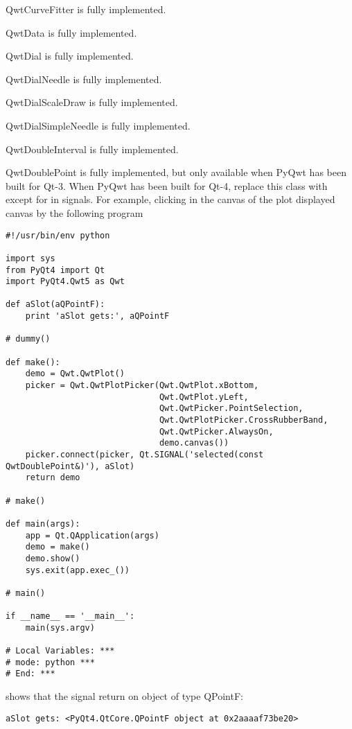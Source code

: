 \documentclass{manual}
\begin{document}
\begin{classdesc*}{QwtCurveFitter}
  is fully implemented.
\end{classdesc*}

\begin{classdesc*}{QwtData}
  is fully implemented.
\end{classdesc*}

\begin{classdesc*}{QwtDial}
  is fully implemented.
\end{classdesc*}

\begin{classdesc*}{QwtDialNeedle}
  is fully implemented.
\end{classdesc*}

\begin{classdesc*}{QwtDialScaleDraw}
  is fully implemented.
\end{classdesc*}

\begin{classdesc*}{QwtDialSimpleNeedle}
  is fully implemented.
\end{classdesc*}

\begin{classdesc*}{QwtDoubleInterval}
  is fully implemented.
\end{classdesc*}

\begin{classdesc*}{QwtDoublePoint}
  is fully implemented, but only available when PyQwt has been built for Qt-3.
  When PyQwt has been built for Qt-4, replace this class with 
  except for in signals.
  For example, clicking in the canvas of the plot displayed canvas by the
  following program
  \begin{verbatim}
#!/usr/bin/env python

import sys
from PyQt4 import Qt
import PyQt4.Qwt5 as Qwt

def aSlot(aQPointF):
    print 'aSlot gets:', aQPointF

# dummy()

def make():
    demo = Qwt.QwtPlot()
    picker = Qwt.QwtPlotPicker(Qwt.QwtPlot.xBottom,
                               Qwt.QwtPlot.yLeft,
                               Qwt.QwtPicker.PointSelection,
                               Qwt.QwtPlotPicker.CrossRubberBand,
                               Qwt.QwtPicker.AlwaysOn,
                               demo.canvas())
    picker.connect(picker, Qt.SIGNAL('selected(const QwtDoublePoint&)'), aSlot)
    return demo

# make()

def main(args):
    app = Qt.QApplication(args)
    demo = make()
    demo.show()
    sys.exit(app.exec_())

# main()

if __name__ == '__main__':
    main(sys.argv)

# Local Variables: ***
# mode: python ***
# End: ***
  \end{verbatim}
  shows that the signal return on object of type QPointF:
  \begin{verbatim}
aSlot gets: <PyQt4.QtCore.QPointF object at 0x2aaaaf73be20>
  \end{verbatim}
\end{classdesc*}
\end{document}
